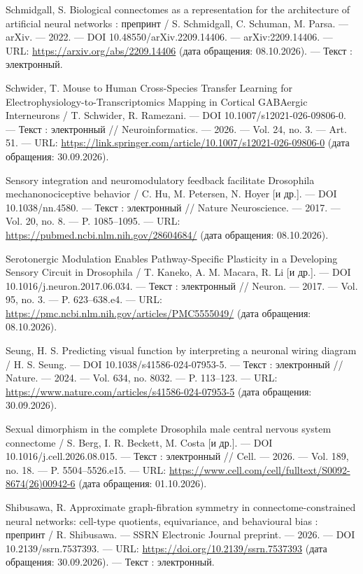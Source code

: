 \begin{list}{}{\setlength{\leftmargin}{10mm}\setlength{\labelwidth}{8mm}\setlength{\labelsep}{2mm}\setlength{\itemsep}{0pt}\setlength{\parsep}{0pt}\setlength{\topsep}{0pt}}
\item[246.] Schmidgall, S. Biological connectomes as a representation for the architecture of artificial neural networks : препринт / S. Schmidgall, C. Schuman, M. Parsa. — arXiv. — 2022. — DOI 10.48550/arXiv.2209.14406. — arXiv:2209.14406. — URL: \url{https://arxiv.org/abs/2209.14406} (дата обращения: 08.10.2026). — Текст : электронный.
\item[247.] Schwider, T. Mouse to Human Cross-Species Transfer Learning for Electrophysiology-to-Transcriptomics Mapping in Cortical GABAergic Interneurons / T. Schwider, R. Ramezani. — DOI 10.1007/s12021-026-09806-0. — Текст : электронный // Neuroinformatics. — 2026. — Vol. 24, no. 3. — Art. 51. — URL: \url{https://link.springer.com/article/10.1007/s12021-026-09806-0} (дата обращения: 30.09.2026).
\item[248.] Sensory integration and neuromodulatory feedback facilitate Drosophila mechanonociceptive behavior / C. Hu, M. Petersen, N. Hoyer [и др.]. — DOI 10.1038/nn.4580. — Текст : электронный // Nature Neuroscience. — 2017. — Vol. 20, no. 8. — P. 1085–1095. — URL: \url{https://pubmed.ncbi.nlm.nih.gov/28604684/} (дата обращения: 08.10.2026).
\item[249.] Serotonergic Modulation Enables Pathway-Specific Plasticity in a Developing Sensory Circuit in Drosophila / T. Kaneko, A. M. Macara, R. Li [и др.]. — DOI 10.1016/j.neuron.2017.06.034. — Текст : электронный // Neuron. — 2017. — Vol. 95, no. 3. — P. 623–638.e4. — URL: \url{https://pmc.ncbi.nlm.nih.gov/articles/PMC5555049/} (дата обращения: 08.10.2026).
\item[250.] Seung, H. S. Predicting visual function by interpreting a neuronal wiring diagram / H. S. Seung. — DOI 10.1038/s41586-024-07953-5. — Текст : электронный // Nature. — 2024. — Vol. 634, no. 8032. — P. 113–123. — URL: \url{https://www.nature.com/articles/s41586-024-07953-5} (дата обращения: 30.09.2026).
\item[251.] Sexual dimorphism in the complete Drosophila male central nervous system connectome / S. Berg, I. R. Beckett, M. Costa [и др.]. — DOI 10.1016/j.cell.2026.08.015. — Текст : электронный // Cell. — 2026. — Vol. 189, no. 18. — P. 5504–5526.e15. — URL: \url{https://www.cell.com/cell/fulltext/S0092-8674(26)00942-6} (дата обращения: 01.10.2026).
\item[252.] Shibusawa, R. Approximate graph-fibration symmetry in connectome-constrained neural networks: cell-type quotients, equivariance, and behavioural bias : препринт / R. Shibusawa. — SSRN Electronic Journal preprint. — 2026. — DOI 10.2139/ssrn.7537393. — URL: \url{https://doi.org/10.2139/ssrn.7537393} (дата обращения: 30.09.2026). — Текст : электронный.

\end{list}
